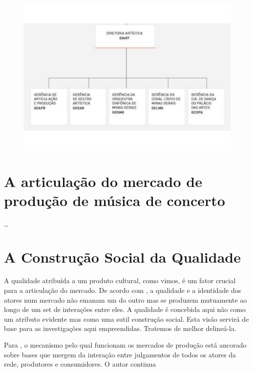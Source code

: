 \documentclass[a4paper, 12pt, openright, oneside, german, french, english, brazil]{abntex2}
\begin{document}
\begin{figure}
		\includegraphics[scale=0.35]{dirartistica.pdf}
		\label{fcsorgdir}
	\end{figure}
	
	
	
	\chapter{A articulação do mercado de produção de música de concerto}
	
	\ldots
	
	
	\chapter{A Construção Social da Qualidade}
	
	A qualidade atribuída a um produto cultural, como vimos, é um fator crucial para a articulação do mercado. De acordo com , a qualidade e a identidade dos atores num mercado não emanam um do outro mas se produzem mutuamente ao longo de um set de interações entre eles. A qualidade é concebida aqui não como um atributo evidente mas como uma sutil construção social. Esta visão servirá de base para as investigações aqui empreendidas. Tratemos de melhor delineá-la.
	
	Para , o mecanismo pelo qual funcionam os mercados de produção está ancorado sobre bases que mergem da interação entre julgamentos de todos os atores da rede, produtores e consumidores. O autor continua
	
\end{document}
